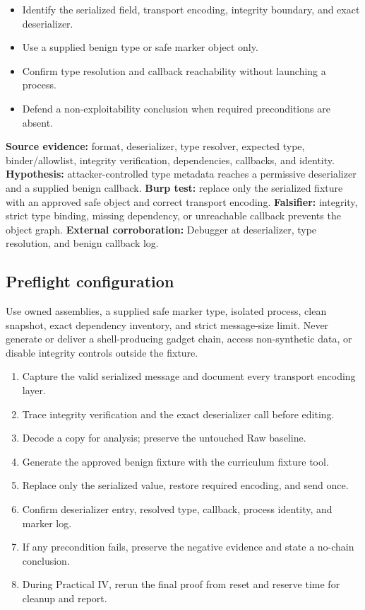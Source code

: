 \documentclass[11pt]{article}
\newcommand{\weekfield}[2]{%
  \Needspace{5\baselineskip}
  \subsection*{#1}
  #2
}
\newcommand{\externalproof}[1]{\textbf{External corroboration:} #1}
\begin{document}
\begin{objectivebox}
\begin{itemize}
  \item Identify the serialized field, transport encoding, integrity boundary, and exact deserializer.
  \item Use a supplied benign type or safe marker object only.
  \item Confirm type resolution and callback reachability without launching a process.
  \item Defend a non-exploitability conclusion when required preconditions are absent.
\end{itemize}
\end{objectivebox}

\begin{bridgebox}
\textbf{Source evidence:} format, deserializer, type resolver, expected type,
binder/allowlist, integrity verification, dependencies, callbacks, and identity.
\textbf{Hypothesis:} attacker-controlled type metadata reaches a permissive
deserializer and a supplied benign callback. \textbf{Burp test:} replace only the
serialized fixture with an approved safe object and correct transport encoding.
\textbf{Falsifier:} integrity, strict type binding, missing dependency, or unreachable
callback prevents the object graph. \externalproof{Debugger at deserializer,
type resolution, and benign callback log.}
\end{bridgebox}

\weekfield{Preflight configuration}{Use owned assemblies, a supplied safe marker
type, isolated process, clean snapshot, exact dependency inventory, and strict
message-size limit. Never generate or deliver a shell-producing gadget chain,
access non-synthetic data, or disable integrity controls outside the fixture.}

\begin{procedurebox}
\begin{enumerate}
  \item Capture the valid serialized message and document every transport encoding layer.
  \item Trace integrity verification and the exact deserializer call before editing.
  \item Decode a copy for analysis; preserve the untouched Raw baseline.
  \item Generate the approved benign fixture with the curriculum fixture tool.
  \item Replace only the serialized value, restore required encoding, and send once.
  \item Confirm deserializer entry, resolved type, callback, process identity, and marker log.
  \item If any precondition fails, preserve the negative evidence and state a no-chain conclusion.
  \item During Practical IV, rerun the final proof from reset and reserve time for cleanup and report.
\end{enumerate}
\end{procedurebox}
\end{document}
